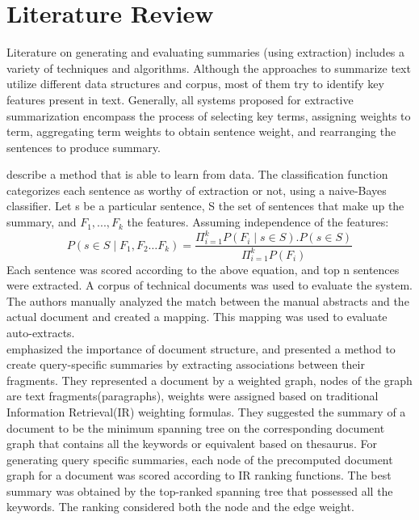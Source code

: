 \chapter{Literature Review}
Literature on generating and evaluating summaries (using extraction)  includes a variety of techniques and algorithms. Although the approaches to summarize 
text utilize different data structures and corpus, most of them try to identify key features present in text. Generally, all systems proposed for extractive summarization
encompass the process of selecting key terms, assigning weights to term, aggregating term weights to obtain sentence weight, and rearranging the sentences 
to produce summary.

 describe a method that is able to learn from data. The classification function categorizes each sentence as worthy of extraction 
or not, using a naive-Bayes classifier. Let s be a particular sentence, S the set of sentences that make up the summary, and $F_{1} , . . . , F_{k}$ the features.
Assuming independence of the features:
 \begin{displaymath}
  P(s \in S \mid F_{1},F_{2} \ldots F_{k}) = \frac{\Pi_{i=1}^k P(F_{i} \mid s\in S ) . P(s\in S)}{\Pi_{i=1}^k P(F_{i})}
 \end{displaymath}
Each sentence was scored according to the above equation, and top n sentences were extracted. A corpus of technical documents was used to evaluate the system.
The authors manually analyzed the match between the manual abstracts and the actual document and created a mapping. This mapping was used to evaluate auto-extracts.\\

emphasized the importance of document structure, and presented a method to create query-specific summaries by extracting associations between their
fragments. They represented a document by a weighted graph, nodes of the graph are text fragments(paragraphs), weights were assigned based on traditional Information
Retrieval(IR) weighting formulas. They suggested the summary of a document to be the minimum spanning tree on the corresponding document graph that contains all the 
keywords or equivalent based on thesaurus. For generating query specific summaries, each node of the precomputed document graph for a document was scored according
to IR ranking functions. The best summary was obtained by the top-ranked spanning tree that possessed all the keywords.
The ranking considered both the node and the edge weight.\\

